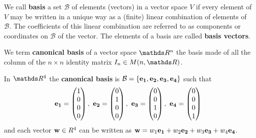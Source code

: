 \documentclass[computationalMathematics.tex]{subfiles}
\begin{document}
\begin{definition}[Basis]
  We call \textbf{basis} a set $\mathcal{B}$ of elements (vectors) in a vector space $V$ if every element of $V$ may be written in a unique way as a (finite) linear combination of elements of $\mathcal{B}$.
  The coefficients of this linear combination are referred to as components or coordinates on $\mathcal{B}$ of the vector.
  The elements of a basis are called \textbf{basis vectors}.
\end{definition}

\begin{definition}
  We term \textbf{canonical basis} of a vector space $\R^n$ the basis made of all the column of the $n \times n$ identity matrix $I_n \in M(n, \R)$.
\end{definition}

\begin{example}
  In $\R^4$ the \textbf{canonical basis} is $ \mathcal{B} = \{ {\bf e_1 }, {\bf e_2 }, {\bf e_3 }, {\bf e_4 }\}$ such that
  \[
  {\bf e_1 } = \begin{pmatrix} 1\\ 0\\ 0\\ 0 \end{pmatrix},~
  {\bf e_2 } = \begin{pmatrix} 0\\ 1\\ 0\\ 0 \end{pmatrix},~
  {\bf e_3 } = \begin{pmatrix} 0\\ 0\\ 1\\ 0 \end{pmatrix},~
  {\bf e_4 } = \begin{pmatrix} 0\\ 0\\ 0\\ 1 \end{pmatrix}
\]
  and each vector ${\bf w } \in R^4$ can be written as ${\bf w } = w_1{\bf e_1 } + w_2{\bf e_2 } + w_3{\bf e_3 } + w_4{\bf e_4 }$.
\end{example}

\end{document}
